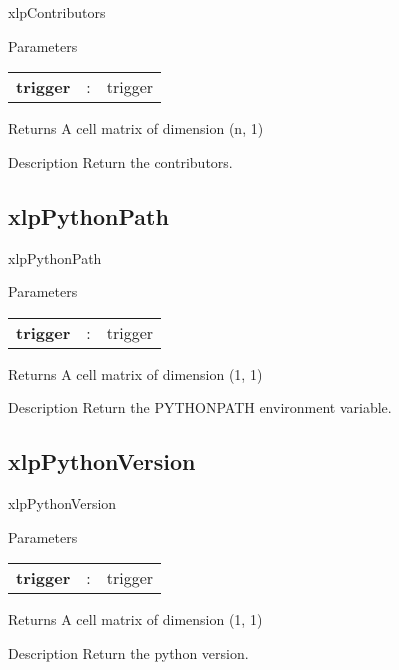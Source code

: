 \begin{xlpfunctitle}{xlpContributors}
\begin{xlpfunc}{Parameters}
\begin{tabular}{p{3.5cm}cl}
\textbf{trigger}& : & trigger \\
\end{tabular}
\end{xlpfunc}


\begin{xlpfunc}{Returns}
A cell matrix of dimension (n, 1)
\end{xlpfunc}

\begin{xlpfunc}{Description}
Return the \xlp contributors.
\end{xlpfunc}
\end{xlpfunctitle}


\subsection{xlpPythonPath}

\begin{xlpfunctitle}{xlpPythonPath}
\begin{xlpfunc}{Parameters}
\begin{tabular}{p{3.5cm}cl}
\textbf{trigger}& : & trigger \\
\end{tabular}
\end{xlpfunc}


\begin{xlpfunc}{Returns}
A cell matrix of dimension (1, 1)
\end{xlpfunc}

\begin{xlpfunc}{Description}
Return the PYTHONPATH environment variable.
\end{xlpfunc}
\end{xlpfunctitle}



\subsection{xlpPythonVersion}

\begin{xlpfunctitle}{xlpPythonVersion}
\begin{xlpfunc}{Parameters}
\begin{tabular}{p{3.5cm}cl}
\textbf{trigger}& : & trigger \\
\end{tabular}
\end{xlpfunc}


\begin{xlpfunc}{Returns}
A cell matrix of dimension (1, 1)
\end{xlpfunc}

\begin{xlpfunc}{Description}
Return the python version.
\end{xlpfunc}
\end{xlpfunctitle}


